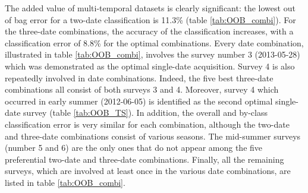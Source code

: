 \documentclass[remotesensing,article,submit,moreauthors,pdftex,12pt,a4paper]{mdpi} %
\begin{document}
The added value of multi-temporal datasets is clearly significant: the lowest out of bag error for a two-date classification is 11.3\% (table \ref{tab:OOB_combi}). For the three-date combinations, the accuracy of the classification increases, with a classification error of 8.8\% for the optimal combinations.
Every date combination, illustrated in table \ref{tab:OOB_combi}, involves the survey number 3 (2013-05-28) which was demonstrated as the optimal single-date acquisition.  
Survey 4 is also repeatedly involved in date combinations. 
Indeed, the five best three-date combinations all consist of both surveys 3 and 4. 
Moreover, survey 4 which occurred in early summer (2012-06-05) is identified as the second optimal single-date survey (table \ref{tab:OOB_TS}). 
In addition, the overall and by-class classification error is very similar for each combination, although the two-date and three-date combinations consist of various seasons. 
The mid-summer surveys (number 5 and 6) are the only ones that do not appear among the five preferential two-date and three-date combinations. 
Finally, all the remaining surveys, which are involved at least once in the various date combinations, are listed in table \ref{tab:OOB_combi}.
\end{document}
